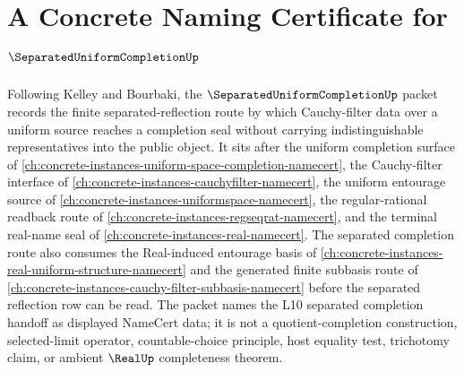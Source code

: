 \chapter{A Concrete Naming Certificate for $\SeparatedUniformCompletionUp$}
\label{ch:concrete-instances-separated-uniform-completion-namecert}

Following Kelley and Bourbaki, the $\SeparatedUniformCompletionUp$ packet records the finite separated-reflection route by which Cauchy-filter data over a uniform source reaches a completion seal without carrying indistinguishable representatives into the public object. It sits after the uniform completion surface of \autoref{ch:concrete-instances-uniform-space-completion-namecert}, the Cauchy-filter interface of \autoref{ch:concrete-instances-cauchyfilter-namecert}, the uniform entourage source of \autoref{ch:concrete-instances-uniformspace-namecert}, the regular-rational readback route of \autoref{ch:concrete-instances-regseqrat-namecert}, and the terminal real-name seal of \autoref{ch:concrete-instances-real-namecert}. The separated completion route also consumes the Real-induced entourage basis of \autoref{ch:concrete-instances-real-uniform-structure-namecert} and the generated finite subbasis route of \autoref{ch:concrete-instances-cauchy-filter-subbasis-namecert} before the separated reflection row can be read. The packet names the L10 separated completion handoff as displayed NameCert data; it is not a quotient-completion construction, selected-limit operator, countable-choice principle, host equality test, trichotomy claim, or ambient $\RealUp$ completeness theorem.

